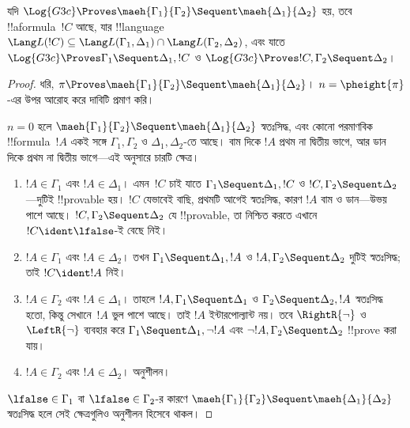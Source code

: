 \documentclass[../../../include/open-logic-section]{subfiles}
\begin{document}
\begin{lem}[মায়েহারার লেমা] যদি $\Log{G3c}
\Proves \maeh{\Gamma_1}{\Gamma_2} \Sequent \maeh{\Delta_1}{\Delta_2}$
হয়, তবে !!a{formula}~$!C$ আছে, যার !!{language}~$\Lang L(!C)
\subseteq \Lang L(\Gamma_1,
\Delta_1) \cap \Lang L(\Gamma_2, \Delta_2)$, এবং যাতে $\Log{G3c}
\Proves \Gamma_1 \Sequent \Delta_1, !C$ ও $\Log{G3c} \Proves !C,
\Gamma_2 \Sequent \Delta_2$।
\end{lem}

\begin{proof}
  ধরি, $\pi \Proves \maeh{\Gamma_1}{\Gamma_2} \Sequent
  \maeh{\Delta_1}{\Delta_2}$। $n=\pheight{\pi}$-এর উপর
  আরোহ করে দাবিটি প্রমাণ করি।

  $n=0$ হলে $\maeh{\Gamma_1}{\Gamma_2} \Sequent
  \maeh{\Delta_1}{\Delta_2}$ স্বতঃসিদ্ধ, এবং কোনো পরমাণবিক
  !!{formula}~$!A$ একই সঙ্গে $\Gamma_1, \Gamma_2$ ও $\Delta_1,
  \Delta_2$-তে আছে। বাম দিকে $!A$ প্রথম না দ্বিতীয় ভাগে,
  আর ডান দিকে প্রথম না দ্বিতীয় ভাগে—এই অনুসারে চারটি ক্ষেত্র।
  \begin{enumerate}
    \item $!A \in \Gamma_1$ এবং $!A \in \Delta_1$। এমন~$!C$ চাই যাতে
    $\Gamma_1 \Sequent \Delta_1, !C$ ও $!C, \Gamma_2
    \Sequent \Delta_2$—দুটিই !!{provable} হয়। $!C$ যেভাবেই বাছি,
    প্রথমটি আগেই স্বতঃসিদ্ধ, কারণ $!A$ বাম ও ডান—উভয় পাশে আছে।
    $!C, \Gamma_2 \Sequent \Delta_2$ যে !!{provable}, তা নিশ্চিত
    করতে এখানে $!C \ident \lfalse$-ই বেছে নিই।
    \item $!A \in \Gamma_1$ এবং $!A \in \Delta_2$। তখন $\Gamma_1
    \Sequent \Delta_1, !A$ ও $!A, \Gamma_2 \Sequent \Delta_2$
    দুটিই স্বতঃসিদ্ধ; তাই $!C \ident !A$ নিই।
    \item $!A \in \Gamma_2$ এবং $!A \in \Delta_1$। তাহলে $!A, \Gamma_1
    \Sequent \Delta_1$ ও $\Gamma_2 \Sequent \Delta_2, !A$
    স্বতঃসিদ্ধ হতো, কিন্তু সেখানে~$!A$ ভুল পাশে আছে। তাই $!A$
    ইন্টারপোল্যান্ট নয়। তবে $\RightR{\lnot}$ ও $\LeftR{\lnot}$
    ব্যবহার করে $\Gamma_1 \Sequent \Delta_1, \lnot!A$ এবং
    $\lnot !A, \Gamma_2 \Sequent \Delta_2$ !!{prove} করা যায়।
    \item $!A \in \Gamma_2$ এবং $!A \in \Delta_2$। অনুশীলন।
  \end{enumerate}
  $\lfalse \in \Gamma_1$ বা $\lfalse \in \Gamma_2$-র কারণে
  $\maeh{\Gamma_1}{\Gamma_2} \Sequent
  \maeh{\Delta_1}{\Delta_2}$ স্বতঃসিদ্ধ হলে সেই ক্ষেত্রগুলিও
  অনুশীলন হিসেবে থাকল।


\end{proof}
\end{document}
